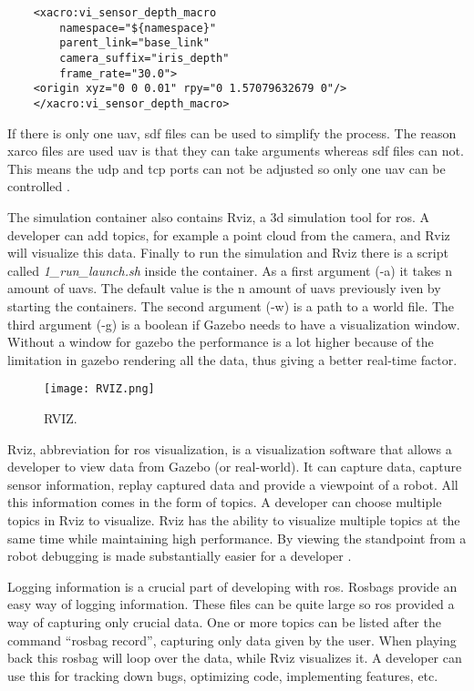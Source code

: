 \begin{verbatim}
    <xacro:vi_sensor_depth_macro
        namespace="${namespace}"
        parent_link="base_link"
        camera_suffix="iris_depth"
        frame_rate="30.0">
    <origin xyz="0 0 0.01" rpy="0 1.57079632679 0"/>
    </xacro:vi_sensor_depth_macro>

\end{verbatim}

If there is only one \acs{uav}, \acs{sdf} files can be used to simplify the process. The reason xarco files are used \acs{uav} is that 
they can take arguments 
whereas \acs{sdf} files can not. 
This means the \acs{udp} and \acs{tcp} ports can not be adjusted so only one \acs{uav} can be controlled \cite{sim:issue}. 

\newpage
The simulation container also contains Rviz, a \acs{3d} simulation tool for \acs{ros}. A developer can add topics, 
for example a point cloud from the camera, 
and Rviz will visualize this data.     
Finally to run the simulation and Rviz there is a script called \textit{1\_run\_launch.sh} inside the container. 
As a first argument (-a) it takes n amount of \acp{uav}. The default value is the n amount of \acp{uav} previously 
iven by starting the containers. 
The second argument (-w) is a path to a world file. The third argument (-g) is a boolean if Gazebo needs to have a visualization window. 
Without a window for gazebo the performance is a lot higher because of the limitation in gazebo rendering all 
the data, thus giving a better real-time factor.

\begin{figure}[ht]
    \centering
    \texttt{[image: RVIZ.png]}
    \caption[RIVZ]{RVIZ\footnotemark.}
\end{figure}

Rviz, abbreviation for \acs{ros} visualization, is a visualization software that allows a developer to view data from Gazebo (or real-world). 
It can capture data, capture sensor information, replay captured data and provide a viewpoint of a robot. All this information 
comes in the form of topics. 
A developer can choose multiple topics in Rviz to visualize. Rviz has the ability to visualize multiple topics at the same 
time while maintaining high performance. 
By viewing the standpoint from a robot debugging is made substantially easier for a developer \cite{ros:rviz}.


Logging information is a crucial part of developing with \acs{ros}. Rosbags provide an easy way of logging information. 
These files can be quite large so \acs{ros} provided a way of capturing only crucial data. 
One or more topics can be listed after the command “rosbag record”, capturing only data given by the user. When playing back this rosbag will 
loop over the data, while Rviz visualizes it. A developer can use this for tracking down bugs, optimizing code, implementing features, etc.